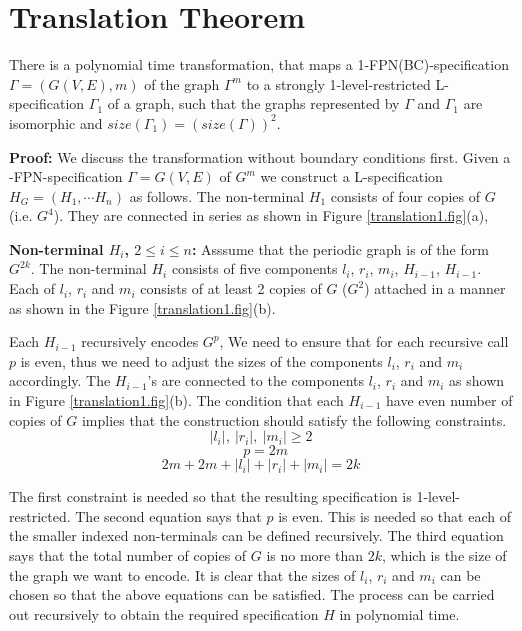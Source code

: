\section{Translation Theorem}\label{sec:translation}


\begin{theorem}\label{th:translate}
There is a polynomial time transformation, that maps a 
1-FPN(BC)-specification $\Gamma = (G(V,E), m)$ of the  graph $\Gamma^m$ 
to a strongly 1-level-restricted 
L-specification $\Gamma_1$ of a graph, 
such that the graphs represented by 
$\Gamma$ and $\Gamma_1$ are isomorphic and 
$size(\Gamma_1) = (size(\Gamma))^2$.
\end{theorem}

\noindent
{\bf Proof:} We discuss the transformation without boundary conditions first.
Given a {-FPN}-specification  $\Gamma = G(V,E)$ of $G^m$ 
we construct a {\sf L}-specification $H_G = (H_1, \cdots H_n)$ as follows. 
The non-terminal $H_1$  consists of four copies of $G$ (i.e. $G^4$). 
They are connected in series as shown in Figure \ref{translation1.fig}(a), 

\iffalse
\begin{figure}[tbp]
\centerline{translation1}
\caption{Construction of $H_i$, $1 \leq i \leq n$}
\label{translation1.fig}
\end{figure}
\fi




\noindent 
{\bf Non-terminal  $H_i$, $2 \leq i \leq n$:}
Asssume that the periodic graph is of the form $G^{2k}$.
The non-terminal $H_i$ consists of five components
$l_i$, $r_i$, $m_i$, $H_{i-1}$, $H_{i-1}$. 
Each of $l_i$, $r_i$ and  $m_i$ consists of at least 2 copies of $G$ 
($G^2$) attached in a manner as shown in the Figure \ref{translation1.fig}(b). 

Each $H_{i-1}$ recursively encodes $G^{p}$, 
We need to ensure that for each recursive
call $p$ is even, thus we need to adjust the sizes of 
the components $l_i$, $r_i$ and  $m_i$ accordingly.
The $H_{i-1}$'s 
are connected to the components $l_i$, $r_i$ and  $m_i$ as shown in 
Figure \ref{translation1.fig}(b). 
The condition that each $H_{i-1}$ have even number of copies of $G$ 
implies that the construction should satisfy the following constraints.
\[ |l_i|, ~ |r_i|, ~  |m_i| \geq 2 \]  
\[~~~ p = 2m \] 
\[2m + 2m + |l_i| + |r_i| +  |m_i| = 2k \]  


The first constraint is needed so that the resulting specification is 
1-level-restricted. The second equation says that $p$ is even. This is needed 
so that each of the smaller indexed non-terminals  
can be defined recursively. 
The third equation says that the 
total number of copies of $G$ is no more than $2k$, which is the size of the
graph we want to encode. It is clear that the sizes of $l_i$, 
$r_i$ and $m_i$ can be chosen  so that the above equations can be satisfied.
The process can be
carried out recursively to obtain the required specification $H$
in polynomial time.

